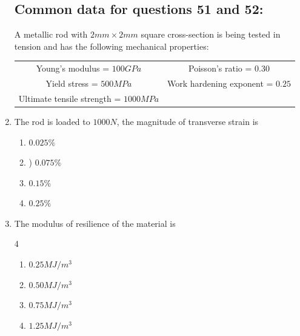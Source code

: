 \documentclass[journal]{IEEEtran}
\theoremstyle{remark}
\begin{document}
\begin{enumerate}
\subsection*{Common data for questions 51 and 52:}
A metallic rod with $2 mm \times 2 mm$ square cross-section is being tested in tension and has the following mechanical properties: \\
\begin{center}
    \begin{tabular}{c c}
      Young's modulus = $100 GPa$  & Poisson's ratio = $0.30$ \\
     Yield stress = $500 MPa$   & Work hardening exponent = $0.25$\\
     Ultimate tensile strength = $1000 MPa$&  
    \end{tabular}
\end{center}
\item   The rod is loaded to $1000 N$, the magnitude of transverse strain is
\hfill{}
\begin{multicols}{4}
\begin{enumerate}
\item   $0.025\%$
\item) $0.075\%$
\item  $0.15\%$
\item $0.25\%$
\end{enumerate}
\end{multicols}

\item   The modulus of resilience of the material is
\hfill{}

\begin {multicols}{4}
\begin{enumerate}
\item  $0.25 MJ/m^3$
\item  $0.50 MJ/m^3$
\item  $0.75 MJ/m^3$
\item  $1.25 MJ/m^3$
\end{enumerate}
\end{multicols}

\end{enumerate}
\end{document}
